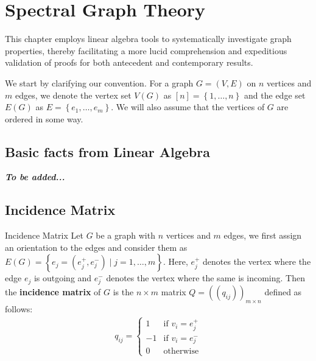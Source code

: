 \documentclass[../basic_graph_theory.tex]{subfiles}
\begin{document}
\chapter{Spectral Graph Theory}
\setcounter{chapter}{8} %
\setcounter{section}{0}
\setcounter{equation}{0}
\setcounter{figure}{0}

This chapter employs linear algebra tools to systematically investigate graph properties, thereby facilitating a more lucid comprehension and expeditious validation of proofs for both antecedent and contemporary results.

\ssk

We start by clarifying our convention. For a graph $ G = (V, E) $ on $ n $ vertices and $ m $ edges, we denote the vertex set $ V(G) $ as $ [n] = \left\{ 1, \dots, n \right\} $ and the edge set $ E(G) $ as $ E = \left\{ e_{1}, \dots, e_{m} \right\} $. We will also assume that the vertices of $ G $ are ordered in some way.

\section{Basic facts from Linear Algebra}

\textit{\textbf{To be added...}}

\section{Incidence Matrix}

\begin{Def}{}{Incidence Matrix}
  Let $G$ be a graph with $n$ vertices and $m$ edges, we first assign an orientation to the edges and consider them as $E(G) = \left\{ e_j = \left( e_j^{+}, e_j^{-} \right) \mid j = 1, \dots, m \right\} $. Here, $ e_j^{+} $ denotes the vertex where the edge \(e_j\) is outgoing and $ e_j^{-} $ denotes the vertex where the same is incoming. Then the \textbf{incidence matrix} of $G$ is the $n \times m$ matrix $Q = \left( (q_{ij}) \right)_{m \times n}$ defined as follows:
  \begin{align*}
    q_{ij} = \begin{cases}
               1  & \text{if } v_{i} = e_{j}^{+} \\
               -1 & \text{if } v_{i} = e_{j}^{-} \\
               0  & \text{otherwise}
             \end{cases}
  \end{align*}
\end{Def}
\end{document}
